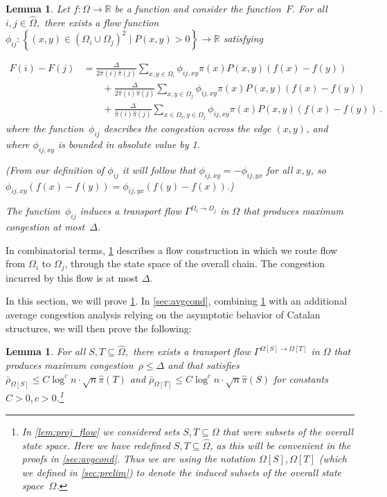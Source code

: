 \documentclass[a4paper, 12p]{article}
\numberwithin{equation}{section}
\newcommand{\FF}{F}
\newcommand{\Omorproj}{\hat{\Omega}}
\newcommand{\piorproj}{\hat{\pi}}
\newtheorem{lemma}[theorem]{Lemma}
\begin{document}
\begin{lemma}
    \label{lem:l1dirweak}
    Let $f:\Omega\rightarrow \mathbb{R}$ be a function and consider the function~$\FF$. For all $i, j \in \Omorproj,$ there exists a flow function $\phi_{ij}: \left\{(x, y) \in (\Omega_i \cup \Omega_j)^2\mid P(x, y) > 0\right\} \rightarrow \mathbb{R}$ satisfying
    
    \begin{align}
        \FF(i) - \FF(j) &= \frac{\Delta}{2\piorproj(i)\piorproj(j)}\sum_{x, y \in \Omega_i}\phi_{ij,xy}\pi(x)P(x, y)(f(x) - f(y)) \nonumber \\
        & \qquad + \frac{\Delta}{2\piorproj(i)\piorproj(j)}\sum_{x, y \in \Omega_j}\phi_{ij,xy}\pi(x)P(x, y)(f(x) - f(y)) \label{eqn:theflow} \\
        & \qquad + \frac{\Delta}{\piorproj(i)\piorproj(j)}\sum_{x \in \Omega_i, y \in \Omega_j}\phi_{ij,xy}\pi(x)P(x, y)(f(x) - f(y))\,.
    \end{align}
    where the function~$\phi_{ij}$ describes the congestion across the edge $(x, y)$, and where $\phi_{ij,xy}$ is bounded in absolute value by 1.

    (From our definition of $\phi_{ij}$ it will follow that $\phi_{ij,xy} = -\phi_{ij,yx}$ for all $x,y$, so $\phi_{ij,xy}(f(x) - f(y)) = \phi_{ij,yx}(f(y) - f(x))$.)

    The function~$\phi_{ij}$ induces a
    transport flow $\Gamma^{\Omega_i\rightarrow \Omega_j}$ in $\Omega$ that produces maximum congestion at most~$\Delta$.
\end{lemma}

In combinatorial terms, \cref{lem:l1dirweak} describes a flow construction in which we route flow from $\Omega_i$ to $\Omega_j$, through the state space of the overall chain. The congestion incurred by this flow is at most $\Delta$. 

In this section, we will prove \cref{lem:l1dirweak}. In \cref{sec:avgcond}, combining \cref{lem:l1dirweak} with an additional average congestion analysis relying on the asymptotic behavior of Catalan structures, we will then prove the following:

\begin{lemma}
 \label{lem:ldirstrong}
 For all $S, T \subseteq \Omorproj,$ there exists a transport flow $\Gamma^{\Omega[S]\rightarrow \Omega[T]}$ in $\Omega$ that produces maximum congestion~$\rho \leq \Delta$ and that satisfies $\bar\rho_{\Omega[S]} \leq C\log^c n \cdot \sqrt n \piorproj(T)$ and $\bar\rho_{\Omega[T]} \leq C \log^c n \cdot \sqrt n \piorproj(S)$ for constants $C > 0, c > 0$.\footnote{In \cref{lem:proj_flow} we considered sets $S,T \subseteq \Omega$ that were subsets of the overall state space. Here we have redefined $S,T \subseteq \Omorproj$, as this will be convenient in the proofs in \cref{sec:avgcond}. Thus we are using the notation $\Omega[S], \Omega[T]$ (which we defined in \cref{sec:prelim}) to denote the induced subsets of the overall state space~$\Omega$.}
\end{lemma}
\end{document}
